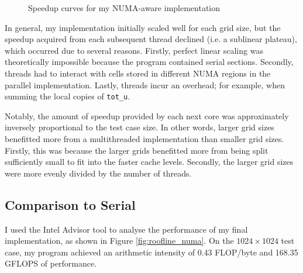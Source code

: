 \documentclass[twocolumn, a4paper]{article}
\begin{document}
\begin{figure}[htpb]
{
  }
  \caption{Speedup curves for my NUMA-aware implementation}\label{fig:scaling}
\end{figure}

In general, my implementation initially scaled well for each grid size, but the speedup acquired from each subsequent thread declined (i.e. a sublinear plateau), which occurred due to several reasons.
Firstly, perfect linear scaling was theoretically impossible because the program contained serial sections.
Secondly, threads had to interact with cells stored in different NUMA regions in the parallel implementation.
Lastly, threads incur an overhead; for example, when summing the local copies of \texttt{tot\_u}.

Notably, the amount of speedup provided by each next core was approximately inversely proportional to the test case size.
In other words, larger grid sizes benefitted more from a multithreaded implementation than smaller grid sizes.
Firstly, this was because the larger grids benefitted more from being split sufficiently small to fit into the faster cache levels.
Secondly, the larger grid sizes were more evenly divided by the number of threads.

\subsection{Comparison to Serial}

I used the Intel Advisor tool to analyse the performance of my final implementation, as shown in Figure \ref{fig:roofline_numa}.
On the $1024\times1024$ test case, my program achieved an arithmetic intensity of 0.43 FLOP/byte and 168.35 GFLOPS of performance.
\end{document}
